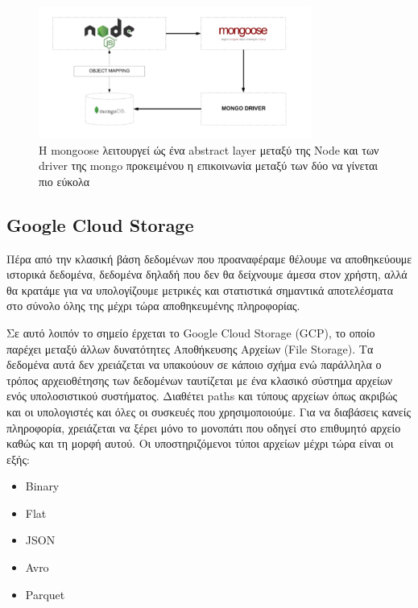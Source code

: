 \begin{figure}[!ht]
	\centering
	\includegraphics[width=0.8\textwidth]{./images/chapter2/mongoose.png}
	\caption[Mongoose, ένα abstract layer μεταξύ Node και mongo]
	{H mongoose λειτουργεί ώς ένα abstract layer μεταξύ της Node και των driver της mongo προκειμένου η επικοινωνία μεταξύ των δύο να γίνεται πιο εύκολα}
	\label{fig:mongoose}
\end{figure}

\break

\subsection{Google Cloud Storage}
\label{subsec:gcloud}

Πέρα από την κλασική βάση δεδομένων που προαναφέραμε θέλουμε να αποθηκεύουμε ιστορικά δεδομένα,
δεδομένα δηλαδή που δεν θα δείχνουμε άμεσα στον χρήστη, αλλά θα κρατάμε για να υπολογίζουμε μετρικές
και στατιστικά σημαντικά αποτελέσματα στο σύνολο όλης της μέχρι τώρα αποθηκευμένης πληροφορίας.

Σε αυτό λοιπόν το σημείο έρχεται το Google Cloud Storage (GCP), το οποίο παρέχει μεταξύ άλλων δυνατότητες
Αποθήκευσης Αρχείων (File Storage). Τα δεδομένα αυτά δεν χρειάζεται να υπακούουν σε κάποιο σχήμα
ενώ παράλληλα ο τρόπος αρχειοθέτησης των δεδομένων ταυτίζεται με ένα κλασικό σύστημα αρχείων
ενός υπολοσιστικού συστήματος. Διαθέτει paths και τύπους αρχείων όπως ακριβώς και οι υπολογιστές και όλες οι
συσκευές που χρησιμοποιούμε. Για να διαβάσεις κανείς πληροφορία, χρειάζεται να ξέρει μόνο το μονοπάτι που οδηγεί
στο επιθυμητό αρχείο καθώς και τη μορφή αυτού. Οι υποστηριζόμενοι τύποι αρχείων μέχρι τώρα είναι οι εξής:

\begin{itemize}
	\item Binary
	\item Flat
	\item JSON
	\item Avro
	\item Parquet
\end{itemize}

